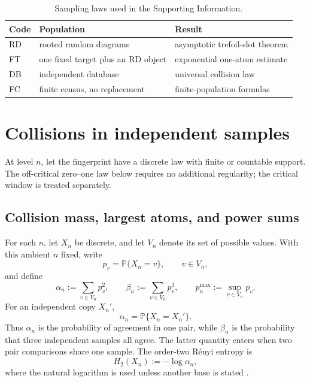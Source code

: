\documentclass[9pt,twoside]{pnas-new}
\theoremstyle{definition}
\theoremstyle{remark}
\renewcommand{\Pr}{\mathbb{P}}
\begin{document}
\begin{table}[ht]
\centering
\caption{Sampling laws used in the Supporting Information.}
\label{tab:ensemble-firewall}
\begin{tabular}{lll}
\toprule
Code & Population & Result \\
\midrule
RD & rooted random diagrams & asymptotic trefoil-slot theorem \\
FT & one fixed target plus an RD object & exponential one-atom estimate \\
DB & independent database & universal collision law \\
FC & finite census, no replacement & finite-population formulas \\
\bottomrule
\end{tabular}
\end{table}
\section{Collisions in independent samples}
\label{si:collision-calculus}

At level $n$, let the fingerprint have a discrete law with finite or countable support. The off-critical zero--one law below requires no additional regularity; the critical window is treated separately.

\subsection{Collision mass, largest atoms, and power sums}
For each $n$, let $X_n$ be discrete, and let $V_n$ denote its set of possible values. With this ambient $n$ fixed, write
\[
p_v=\Pr\{X_n=v\},\qquad v\in V_n,
\]
and define
\begin{equation}
\alpha_n:=\sum_{v\in V_n}p_v^2,
\qquad
\beta_n:=\sum_{v\in V_n}p_v^3,
\qquad
p_n^{\max}:=\sup_{v\in V_n}p_v.
\label{eq:si-power-sums}
\end{equation}
For an independent copy $X_n'$,
\begin{equation}
\alpha_n=\Pr\{X_n=X_n'\}.
\label{eq:si-pair-collision}
\end{equation}
Thus $\alpha_n$ is the probability of agreement in one pair, while $\beta_n$ is the probability that three independent samples all agree. The latter quantity enters when two pair comparisons share one sample.
The order-two R\'enyi entropy is
\begin{equation}
H_2(X_n):=-\log\alpha_n,
\label{eq:si-renyi}
\end{equation}
where the natural logarithm is used unless another base is stated \cite{renyi1961}.
\end{document}
